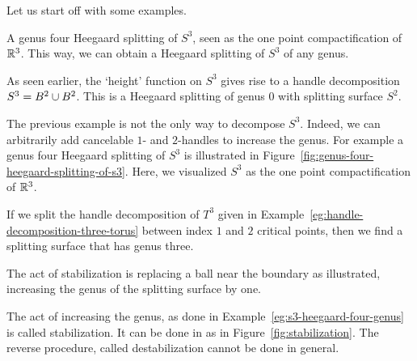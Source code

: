 Let us start off with some examples.
\begin{marginfigure}
    \centering
    \caption{A genus four Heegaard splitting of $S^{3}$, seen as the one point compactification of $\mathbb{R}^3$.
        This way, we can obtain a Heegaard splitting of $S^{3}$ of any genus.
    }
    \label{fig:genus-four-heegaard-splitting-of-s3}
\end{marginfigure}
\begin{eg}
    As seen earlier, the `height' function on $S^{3}$ gives rise to a handle decomposition $S^{3} = B^{2} \cup B^{2}$. This is a Heegaard splitting of genus $0$ with splitting surface $S^{2}$.
\end{eg}
\begin{eg}
    The previous example is not the only way to decompose $S^{3}$.
    Indeed, we can arbitrarily add cancelable $1$- and $2$-handles to increase the genus. 
    For example a genus four Heegaard splitting of $S^{3}$ is illustrated in Figure~\ref{fig:genus-four-heegaard-splitting-of-s3}.
    Here, we visualized $S^{3}$ as the one point compactification of $\mathbb{R}^3$.
    \label{eg:s3-heegaard-four-genus}
\end{eg}

\begin{eg}
    If we split the handle decomposition of $T^{3}$ given in Example~\ref{eg:handle-decomposition-three-torus} between index $1$ and $2$ critical points, then we find a splitting surface that has genus three.
\end{eg}

\begin{marginfigure}
    \centering
    \caption{
        The act of stabilization is replacing a ball near the boundary as illustrated, increasing the genus of the splitting surface by one.}
    \label{fig:stabilization}
\end{marginfigure}
\begin{remark}
    The act of increasing the genus, as done in Example~\ref{eg:s3-heegaard-four-genus} is called stabilization.
    It can be done in as in Figure~\ref{fig:stabilization}.
    The reverse procedure, called destabilization cannot be done in general.
\end{remark}



